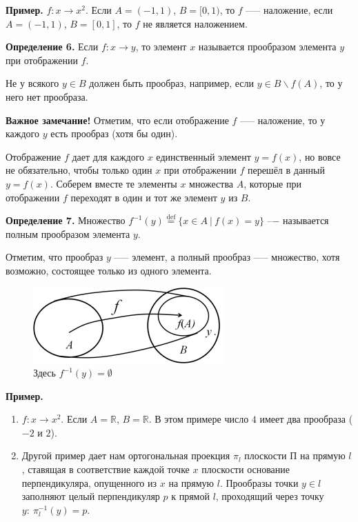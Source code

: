 \documentclass{article}
\begin{document}
    \textbf{Пример.} $f: x \rightarrow x^2$. Если $A = (-1, 1)$, $B = [0, 1)$, то $f$ --— наложение, если $A = (-1, 1)$, $B = [0, 1]$, то $f$ не является наложением.

    \textbf{Определение 6.} Если $f: x \rightarrow y$, то элемент $x$ называется прообразом элемента $y$ при отображении $f$.

    Не у всякого $y \in B$ должен быть прообраз, например, если $y \in B \backslash f(A)$, то у него нет прообраза.

    \textbf{Важное замечание!} Отметим, что если отображение $f$ --— наложение, то у каждого $y$ есть прообраз (хотя бы один).

    Отображение $f$ дает для каждого $x$ единственный элемент $y = f(x)$, но вовсе не обязательно, чтобы только один $x$ при отображении $f$ перешёл в данный $y = f(x)$. Соберем вместе те элементы $x$ множества $A$, которые при отображении $f$ переходят в один и тот же элемент $y$ из $B$.

    \textbf{Определение 7.} Множество $f^{-1}(y) \overset{\mathrm{def}}{=} \{x \in A\ |\ f(x) = y\}$ --− называется полным прообразом элемента $y$.

    Отметим, что прообраз $y$ --— элемент, а полный прообраз —-- множество, хотя возможно, состоящее только из одного элемента.

    \begin{figure}[h!]
    \centering
    \includegraphics[scale=0.75]{2_2}
    \caption{\label{fig:fig2}Здесь $f^{-1}(y) = \emptyset$}
    \end{figure}

    \textbf{Пример.}
    
    \begin{enumerate}
        \item $f: x \rightarrow x^2$. Если $A = \mathbb{R}$, $B = \mathbb{R}$. В этом примере число $4$ имеет два прообраза ($-2$ и $2$).
        \item Другой пример дает нам ортогональная проекция $\pi_l$ плоскости $\textrm{П}$ на прямую $l$, ставящая в соответствие каждой точке $x$ плоскости основание перпендикуляра, опущенного из $x$ на прямую $l$. Прообразы точки $y \in l$ заполняют целый перпендикуляр $p$ к прямой $l$, проходящий через точку $y:\ \pi_l^{-1}(y) = p$.
    \end{enumerate}
\end{document}
